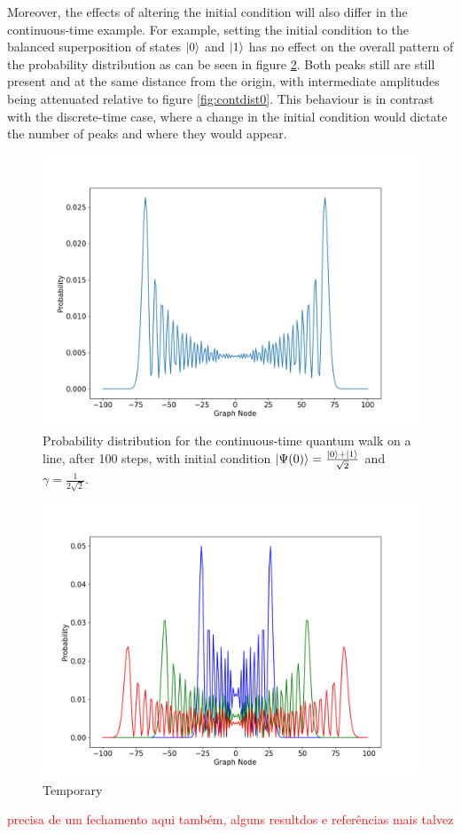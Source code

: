 \documentclass[../../dissertation.tex]{subfiles}
\begin{document}
Moreover, the effects of altering the initial condition will also differ in the continuous-time example. For example, setting the initial condition to the balanced superposition of states $\ket{0}$ and $\ket{1}$ has no effect on the overall pattern of the probability distribution as can be seen in figure \ref{fig:contdist2}. Both peaks still are still present and at the same distance from the origin, with intermediate amplitudes being attenuated relative to figure \ref{fig:contdist0}. This behaviour is in contrast with the discrete-time case, where a change in the initial condition would dictate the number of peaks and where they would appear.

\begin{figure}[!h]
	\centering
	\includegraphics[scale=0.40]{img/ContQuantumWalk/ctqwSingleSup.png}
	\caption{Probability distribution for the continuous-time quantum walk on a line, after 100 steps, with initial condition $\ket{\Psi(0)}=\frac{\ket{0}+\ket{1}}{\sqrt{2}}$ and $\gamma=\frac{1}{2\sqrt{2}}$.} 
	\label{fig:contdist2}
\end{figure}

\begin{figure}[!h]
	\centering
	\includegraphics[scale=0.40]{img/ContQuantumWalk/ctqwMultipleTime.png}
	\caption{Temporary} 
	\label{fig:contdist2}
\end{figure}

\textcolor{red}{precisa de um fechamento aqui também, alguns resultdos e referências mais talvez}

\clearpage
\end{document}
